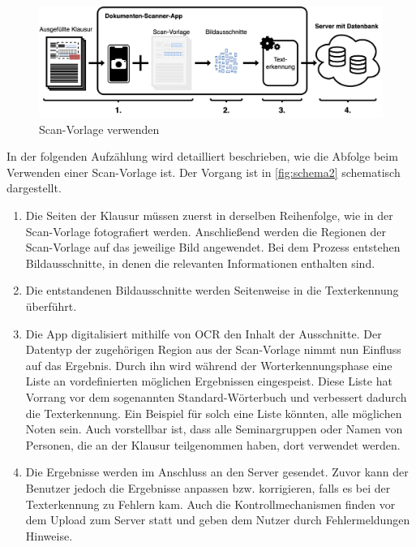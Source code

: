 \documentclass[notables, nomenclature, oneside, 150]{HSMW-Thesis}
\begin{document}
		\begin{figure}[th]
    		\centering
    		\includegraphics[width=\textwidth]{img/schema2}
    		\caption{Scan-Vorlage verwenden}
    		\label{fig:schema2}
    	\end{figure}
    	
    	In der folgenden Aufzählung wird detailliert beschrieben, wie die Abfolge beim Verwenden einer Scan-Vorlage ist. Der Vorgang ist in \autoref{fig:schema2} schematisch dargestellt.
	
		\begin{enumerate}
			\item Die Seiten der Klausur müssen zuerst in derselben Reihenfolge, wie in der Scan-Vorlage fotografiert werden. Anschließend werden die Regionen der Scan-Vorlage auf das jeweilige Bild angewendet. Bei dem Prozess entstehen Bildausschnitte, in denen die relevanten Informationen enthalten sind.
			\item Die entstandenen Bildausschnitte werden Seitenweise in die Texterkennung überführt.
			\item Die App digitalisiert mithilfe von OCR den Inhalt der Ausschnitte. Der Datentyp der zugehörigen Region aus der Scan-Vorlage nimmt nun Einfluss auf das Ergebnis. Durch ihn wird während der Worterkennungsphase eine Liste an vordefinierten möglichen Ergebnissen eingespeist. Diese Liste hat Vorrang vor dem sogenannten Standard-Wörterbuch und verbessert dadurch die Texterkennung. Ein Beispiel für solch eine Liste könnten, alle möglichen Noten sein. Auch vorstellbar ist, dass alle Seminargruppen oder Namen von Personen, die an der Klausur teilgenommen haben, dort verwendet werden.
			\item Die Ergebnisse werden im Anschluss an den Server gesendet. Zuvor kann der Benutzer jedoch die Ergebnisse anpassen bzw. korrigieren, falls es bei der Texterkennung zu Fehlern kam. Auch die Kontrollmechanismen finden vor dem Upload zum Server statt und geben dem Nutzer durch Fehlermeldungen Hinweise. \label{it:senden}
		\end{enumerate}
		
\end{document}
